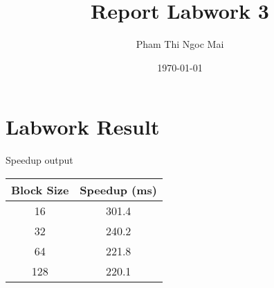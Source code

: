 \documentclass{article}
\title{Report Labwork 3}
\author{Pham Thi Ngoc Mai}
\date{\today}
\begin{document}
\maketitle

\section{Labwork Result}
Speedup output
\begin{center}
    \begin{tabular}{c|c}
        Block Size & Speedup (ms)  \\
        \hline
        16 & 301.4 \\
        32 & 240.2 \\
        64 & 221.8 \\
        128 & 220.1
    \end{tabular}
\end{center}
\end{document}
